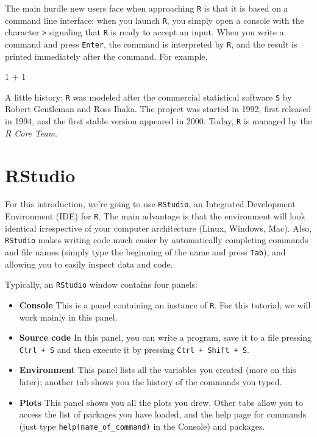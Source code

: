 \documentclass[
  letterpaper,
  DIV=11,
  numbers=noendperiod]{scrreprt}
\newenvironment{Shaded}{\begin{snugshade}}{\end{snugshade}}
\newcommand{\NormalTok}[1]{\textcolor[rgb]{0.00,0.23,0.31}{#1}}
\providecommand{\tightlist}{%
  \setlength{\itemsep}{0pt}\setlength{\parskip}{0pt}}\usepackage{longtable,booktabs,array}
\begin{document}
The main hurdle new users face when approaching \texttt{R} is that it is
based on a command line interface: when you launch \texttt{R}, you
simply open a console with the character \texttt{\textgreater{}}
signaling that \texttt{R} is ready to accept an input. When you write a
command and press \texttt{Enter}, the command is interpreted by
\texttt{R}, and the result is printed immediately after the command. For
example,

\begin{Shaded}
\begin{Highlighting}[]
\NormalTok{1 + 1}
\end{Highlighting}
\end{Shaded}

A little history: \texttt{R} was modeled after the commercial
statistical software \texttt{S} by Robert Gentleman and Ross Ihaka. The
project was started in 1992, first released in 1994, and the first
stable version appeared in 2000. Today, \texttt{R} is managed by the
\emph{R Core Team}.

\section*{RStudio}\label{rstudio}


For this introduction, we're going to use \texttt{RStudio}, an
Integrated Development Environment (IDE) for \texttt{R}. The main
advantage is that the environment will look identical irrespective of
your computer architecture (Linux, Windows, Mac). Also, \texttt{RStudio}
makes writing code much easier by automatically completing commands and
file names (simply type the beginning of the name and press
\texttt{Tab}), and allowing you to easily inspect data and code.

Typically, an \texttt{RStudio} window contains four panels:

\begin{itemize}
\tightlist
\item
  \textbf{Console} This is a panel containing an instance of \texttt{R}.
  For this tutorial, we will work mainly in this panel.
\item
  \textbf{Source code} In this panel, you can write a program, save it
  to a file pressing \texttt{Ctrl\ +\ S} and then execute it by pressing
  \texttt{Ctrl\ +\ Shift\ +\ S}.
\item
  \textbf{Environment} This panel lists all the variables you created
  (more on this later); another tab shows you the history of the
  commands you typed.
\item
  \textbf{Plots} This panel shows you all the plots you drew. Other tabs
  allow you to access the list of packages you have loaded, and the help
  page for commands (just type \texttt{help(name\_of\_command)} in the
  Console) and packages.
\end{itemize}
\end{document}
